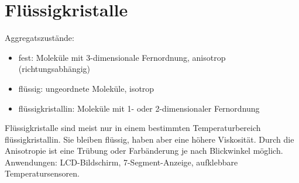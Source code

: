 \newpage

\section{Flüssigkristalle}
Aggregatszustände:
\begin{itemize}
	\item fest: Moleküle mit 3-dimensionale Fernordnung, anisotrop (richtungsabhängig)
	\item flüssig: ungeordnete Moleküle, isotrop
	\item flüssigkristallin: Moleküle mit 1- oder 2-dimensionaler Fernordnung
\end{itemize}

Flüssigkristalle sind meist nur in einem bestimmten Temperaturbereich flüssigkristallin. Sie bleiben flüssig, haben aber eine höhere Viskosität. Durch die Anisotropie ist eine Trübung oder Farbänderung je nach Blickwinkel möglich. \\

Anwendungen: LCD-Bildschirm, 7-Segment-Anzeige, aufklebbare Temperatursensoren. \\

